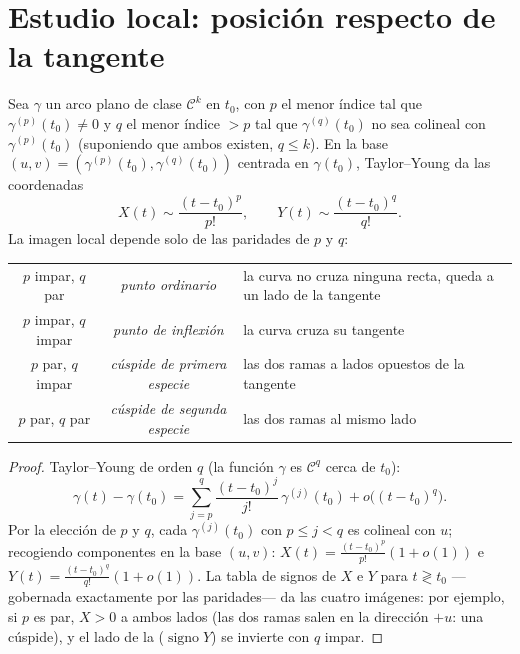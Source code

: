\section{Estudio local: posición respecto de la tangente}

\begin{proposition}\label{prop:b2:curves:local}
Sea $\gamma$ un arco plano de clase $\mathcal{C}^k$ en $t_0$, con $p$
el menor índice tal que $\gamma^{(p)}(t_0) \neq 0$ y $q$ el menor
índice $> p$ tal que $\gamma^{(q)}(t_0)$ no sea colineal con
$\gamma^{(p)}(t_0)$ (suponiendo que ambos existen, $q \leq k$). En la
base $(u, v) = (\gamma^{(p)}(t_0), \gamma^{(q)}(t_0))$ centrada en
$\gamma(t_0)$, Taylor--Young da las coordenadas
\[
X(t) \sim \frac{(t - t_0)^p}{p!},
\qquad
Y(t) \sim \frac{(t - t_0)^q}{q!} .
\]
La imagen local depende solo de las paridades de $p$ y $q$:
\begin{center}
\begin{tabular}{c c p{5.1cm}}
$p$ impar, $q$ par & \emph{punto ordinario} & la curva no cruza
ninguna recta, queda a un lado de la tangente\\
$p$ impar, $q$ impar & \emph{punto de inflexión} & la curva cruza su
tangente\\
$p$ par, $q$ impar & \emph{cúspide de primera especie} & las dos
ramas a lados opuestos de la tangente\\
$p$ par, $q$ par & \emph{cúspide de segunda especie} & las dos ramas
al mismo lado\\
\end{tabular}
\end{center}
\end{proposition}

\begin{proof}
Taylor--Young de orden $q$ (la función $\gamma$ es $\mathcal{C}^q$
cerca de $t_0$):
\[
\gamma(t) - \gamma(t_0)
= \sum_{j=p}^{q} \frac{(t-t_0)^j}{j!}\,\gamma^{(j)}(t_0)
+ o\bigl((t-t_0)^q\bigr).
\]
Por la elección de $p$ y $q$, cada $\gamma^{(j)}(t_0)$ con $p \leq j
< q$ es colineal con $u$; recogiendo componentes en la base $(u, v)$:
$X(t) = \frac{(t-t_0)^p}{p!}(1 + o(1))$ e $Y(t) =
\frac{(t-t_0)^q}{q!}(1 + o(1))$. La tabla de signos de $X$ e $Y$ para
$t \gtrless t_0$ ---gobernada exactamente por las paridades--- da las
cuatro imágenes: por ejemplo, si $p$ es par, $X > 0$ a ambos lados
(las dos ramas salen en la dirección $+u$: una cúspide), y el lado de
la  ($\operatorname{signo} Y$) se invierte con $q$
impar.
\end{proof}

